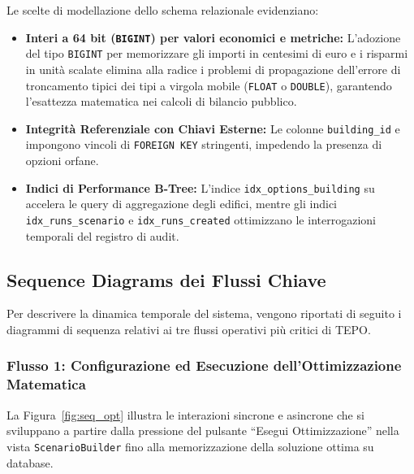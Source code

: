 Le scelte di modellazione dello schema relazionale evidenziano:
\begin{itemize}[leftmargin=1.5em, itemsep=0.2em]
    \item \textbf{Interi a 64 bit (\texttt{BIGINT}) per valori economici e metriche:} L'adozione del tipo \texttt{BIGINT} per memorizzare gli importi in centesimi di euro e i risparmi in unità scalate elimina alla radice i problemi di propagazione dell'errore di troncamento tipici dei tipi a virgola mobile (\texttt{FLOAT} o \texttt{DOUBLE}), garantendo l'esattezza matematica nei calcoli di bilancio pubblico.
    \item \textbf{Integrità Referenziale con Chiavi Esterne:} Le colonne \texttt{building\_id} e  impongono vincoli di \texttt{FOREIGN KEY} stringenti, impedendo la presenza di opzioni orfane.
    \item \textbf{Indici di Performance B-Tree:} L'indice \texttt{idx\_options\_building} su  accelera le query di aggregazione degli edifici, mentre gli indici \texttt{idx\_runs\_scenario} e \texttt{idx\_runs\_created} ottimizzano le interrogazioni temporali del registro di audit.
\end{itemize}

\subsection{Sequence Diagrams dei Flussi Chiave}
Per descrivere la dinamica temporale del sistema, vengono riportati di seguito i diagrammi di sequenza relativi ai tre flussi operativi più critici di TEPO.

\subsubsection{Flusso 1: Configurazione ed Esecuzione dell'Ottimizzazione Matematica}
La Figura~\ref{fig:seq_opt} illustra le interazioni sincrone e asincrone che si sviluppano a partire dalla pressione del pulsante ``Esegui Ottimizzazione'' nella vista \texttt{ScenarioBuilder} fino alla memorizzazione della soluzione ottima su database.

